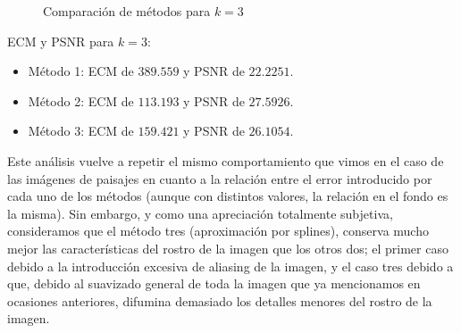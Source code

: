 \begin{figure}[H]
    \centering
    \qquad
    \qquad
    \caption{Comparación de métodos para $k = 3$}
    \label{fig:example}
\end{figure}

ECM y PSNR para $k = 3$:

\begin{itemize}
 \item Método 1: ECM de $389.559$ y PSNR de $22.2251$.
 \item Método 2: ECM de $113.193$ y PSNR de $27.5926$.
 \item Método 3: ECM de $159.421$ y PSNR de $26.1054$.
\end{itemize}

Este análisis vuelve a repetir el mismo comportamiento que vimos en el caso de las imágenes de paisajes en cuanto a la relación entre el error introducido por cada uno de los métodos (aunque con distintos valores, la relación en el fondo es la misma). Sin embargo, y como una apreciación totalmente subjetiva, consideramos que el método tres (aproximación por splines), conserva mucho mejor las características del rostro de la imagen que los otros dos; el primer caso debido a la introducción excesiva de aliasing de la imagen, y el caso tres debido a que, debido al suavizado general de toda la imagen que ya mencionamos en ocasiones anteriores, difumina demasiado los detalles menores del rostro de la imagen.

